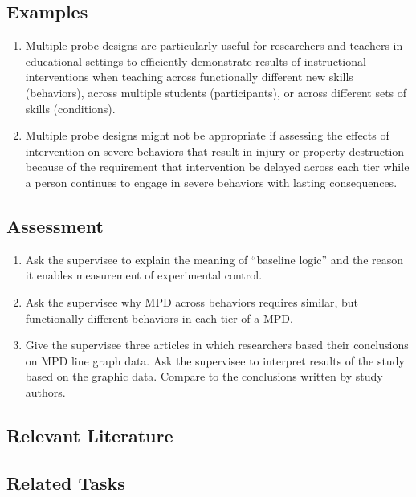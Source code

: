 \subsection{Examples}
\begin{enumerate}
\item Multiple probe designs are particularly useful for researchers and teachers in educational settings to efficiently demonstrate results of instructional interventions when teaching across functionally different new skills (behaviors), across multiple students (participants), or across different sets of skills (conditions).
\item Multiple probe designs might not be appropriate if assessing the effects of intervention on severe behaviors that result in injury or property destruction because of the requirement that intervention be delayed across each tier while a person continues to engage in severe behaviors with lasting consequences.
\end{enumerate}
%
\subsection{Assessment}
\begin{enumerate}
\item Ask the supervisee to explain the meaning of ``baseline logic'' and the reason it enables measurement of experimental control.
\item Ask the supervisee why MPD across behaviors requires similar, but functionally different behaviors in each tier of a MPD.
\item Give the supervisee three articles in which researchers based their conclusions on MPD line graph data. Ask the supervisee to interpret results of the study based on the graphic data. Compare to the conclusions written by study authors.
\end{enumerate}
%
\subsection{Relevant Literature}
\begin{refsection}
\nocite{ledford2009single,horner1978multiple,thompson1982training}
\printbibliography[heading=none]
\end{refsection}
%
\subsection{Related Tasks}
\fourbThree{}\\
\fourbSeven{}\\
\fourhOne{}\\
\fourhTwo{}\\
\fourhFour{}\\
\fouriFive{}\\
\fourFKThirtySix{}\\
%
%
%
%
%
%
